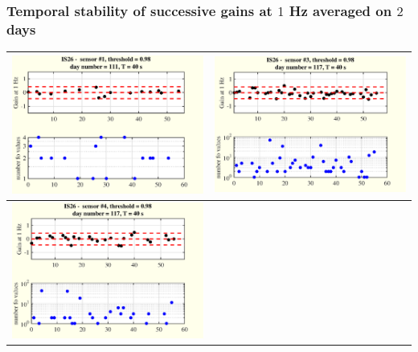 \documentclass[handout,9pt]{beamer}
\begin{document}
\begin{frame}
\frametitle
{Temporal stability of successive gains at $1$ Hz averaged on $2$ days}
\begin{tabular}{c||c}
\includegraphics[scale=0.3]{evolutionon1atfreq1.eps}
&
\includegraphics[scale=0.3]{evolutionon3atfreq1.eps}
\\
\hline\hline
\includegraphics[scale=0.3]{evolutionon4atfreq1.eps}

\end{tabular}
\end{frame}
\end{document}
